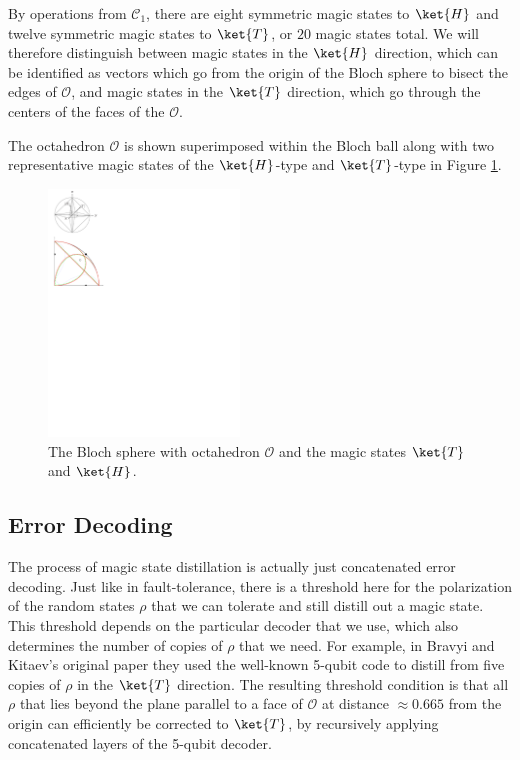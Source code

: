 By operations from $\mathcal{C}_1$, there are eight symmetric
magic states to $\ket{H}$ and twelve symmetric magic states to $\ket{T}$,
or $20$ magic states total. We will therefore distinguish between
magic states in the $\ket{H}$ direction, which can be identified as vectors
which go from the origin of the Bloch sphere to bisect the edges of
$\mathcal{O}$, and magic states in the $\ket{T}$ direction, which
go through the centers of the faces of the $\mathcal{O}$.

The octahedron $\mathcal{O}$ is shown superimposed within the Bloch ball
along with two representative magic states of the $\ket{H}$-type and
$\ket{T}$-type in Figure \ref{fig:clifford-octahedron}.

\begin{figure}
\begin{center}
\includegraphics[width=2in]{figures/blochsphere.pdf}
\caption{The Bloch sphere with octahedron $\mathcal{O}$ and the magic states
$\ket{T}$ and $\ket{H}$.}
\label{fig:clifford-octahedron}
\end{center}
\end{figure}

\subsection{Error Decoding}

The process of magic state distillation is actually just
concatenated error decoding. Just like in fault-tolerance, there is
a threshold here for the polarization of the random states $\rho$ that we
can tolerate and still distill out a magic state. This threshold depends
on the particular decoder that we use, which also determines the number
of copies of $\rho$ that we need. For example, in Bravyi and 
Kitaev's original paper \cite{Bravyi2004} they used the well-known 5-qubit
code to distill from five copies of $\rho$ in the $\ket{T}$ direction.
The resulting threshold condition is that all $\rho$ that lies beyond the plane
parallel to a face of $\mathcal{O}$ at distance $\approx 0.665$ from the
origin can efficiently be corrected to $\ket{T}$, by recursively applying
concatenated layers of the 5-qubit decoder.


